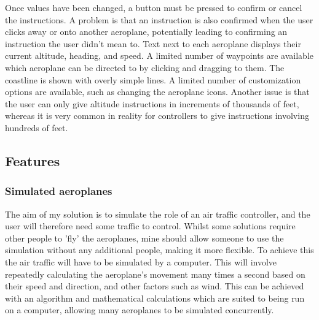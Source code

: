 \documentclass{article}
\begin{document}
Once values have been changed, a button must be pressed to confirm or cancel the instructions.
A problem is that an instruction is also confirmed when the user clicks away or onto another aeroplane, potentially leading to confirming an instruction the user didn't mean to.
Text next to each aeroplane displays their current altitude, heading, and speed.
A limited number of waypoints are available which aeroplane can be directed to by clicking and dragging to them.
The coastline is shown with overly simple lines.
A limited number of customization options are available, such as changing the aeroplane icons.
Another issue is that the user can only give altitude instructions in increments of thousands of feet, whereas it is very common in reality for controllers to give instructions involving hundreds of feet.


\subsection{Features} \label{essentialfeatures}
\subsubsection{Simulated aeroplanes}
The aim of my solution is to simulate the role of an air traffic controller, and the user will therefore need some traffic to control.
Whilst some solutions require other people to 'fly' the aeroplanes, mine should allow someone to use the simulation without any additional people, making it more flexible.
To achieve this the air traffic will have to be simulated by a computer.
This will involve repeatedly calculating the aeroplane's movement many times a second based on their speed and direction, and other factors such as wind.
This can be achieved with an algorithm and mathematical calculations which are suited to being run on a computer, allowing many aeroplanes to be simulated concurrently.
\end{document}
